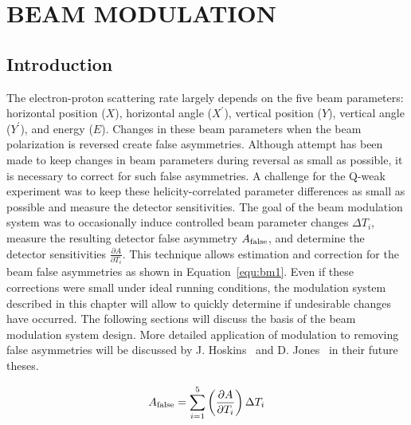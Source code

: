 \chapter{BEAM MODULATION}
\label{BEAM MODULATION}

\section{Introduction}
\label{IntroductionBMod}

The electron-proton scattering rate largely depends on the five beam parameters: horizontal position ($X$), horizontal angle ($X^{\prime}$), vertical position ($Y$), vertical angle ($Y^{\prime}$), and energy ($E$). Changes in these beam parameters when the beam polarization is reversed create false asymmetries. Although attempt has been made to keep changes in beam parameters during reversal as small as possible, it is necessary to correct for such false asymmetries. A challenge for the Q-weak experiment was to keep these helicity-correlated parameter differences as small as possible and measure the detector sensitivities. The goal of the beam modulation system was to occasionally induce controlled beam parameter changes $\Delta T_{i}$, measure the resulting detector false asymmetry $A_{\rm false}$, and determine the detector sensitivities $\displaystyle\frac{\partial A}{\partial T_{i}}$. This technique allows estimation and correction for the beam false asymmetries as shown in Equation~\ref{equ:bm1}. Even if these corrections were small under ideal running conditions, the modulation system described in this chapter will allow to quickly determine if undesirable changes have occurred. 
The following sections will discuss the basis of the beam modulation system design. More detailed application of modulation to removing false asymmetries will be discussed by J. Hoskins~\cite{jhoskins_thesis} and D. Jones~\cite{don_thesis} in their future theses.



\begin{equation} \label{equ:bm1}
A_{\rm false} = \sum^{5}_{i=1} \left(\frac{\partial A }{ \partial T_{i} }\right) \Delta T_{i}
\end{equation}


